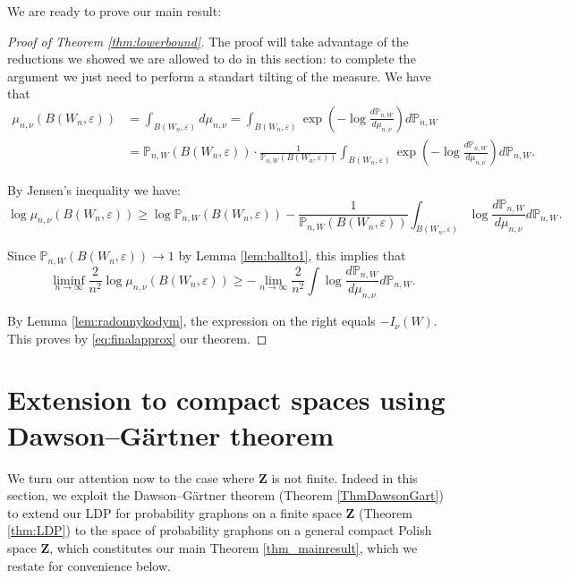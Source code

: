\documentclass[12pt,twoside,a4paper]{article}
\newcommand{\Space}{\mathbf{Z}}
\begin{document}
We are ready to prove our main result:

\begin{proof}[Proof of Theorem \ref{thm:lowerbound}]
The proof will take advantage of the reductions we showed we are allowed to do in this section: to complete the argument we just need to perform a standart tilting of the measure. We have that 
\[
\begin{split}
    \mu_{n,\nu}(B(W_n,\varepsilon)) &= \int_{B(W_n,\varepsilon)} d\mu_{n,\nu} 
= \int_{B(W_n,\varepsilon)} \exp\left( -\log \frac{d\mathbb{P}_{n,W}}{d\mu_{n,\nu}} \right) d\mathbb{P}_{n,W}\\
&= \mathbb{P}_{n,W}(B(W_n,\varepsilon)) \cdot \frac{1}{\mathbb{P}_{n,W}(B(W_n,\varepsilon))} \int_{B(W_n,\varepsilon)} \exp\left( -\log \frac{d\mathbb{P}_{n,W}}{d\mu_{n,\nu}} \right) d\mathbb{P}_{n,W}.
\end{split}
\]

By Jensen’s inequality we have:
\[
\log \mu_{n,\nu}(B(W_n,\varepsilon)) \geq \log \mathbb{P}_{n,W}(B(W_n,\varepsilon))
- \frac{1}{\mathbb{P}_{n,W}(B(W_n,\varepsilon))} \int_{B(W_n,\varepsilon)} \log \frac{d\mathbb{P}_{n,W}}{d\mu_{n,\nu}} d\mathbb{P}_{n,W}.
\]

Since $\mathbb{P}_{n,W}(B(W_n,\varepsilon)) \to 1$ by Lemma \ref{lem:ballto1}, this implies that
\[
\liminf_{n \to \infty} \frac{2}{n^2} \log \mu_{n,\nu}(B(W_n,\varepsilon)) 
\geq - \lim_{n \to \infty} \frac{2}{n^2} \int \log \frac{d\mathbb{P}_{n,W}}{d\mu_{n,\nu}} d\mathbb{P}_{n,W}.
\]

By Lemma \ref{lem:radonnykodym}, the expression on the right equals $-I_\nu(W)$. This proves by \eqref{eq:finalapprox} our theorem. 
\end{proof}

\section{Extension to compact spaces using Dawson--G\"artner theorem}\label{sec:dawsongartner}

We turn our attention now to the case where $\Space$ is not finite. Indeed in this section, we exploit the Dawson--G\"artner theorem (Theorem \ref{ThmDawsonGart}) to extend our LDP for probability graphons on a finite space $\Space$ (Theorem \ref{thm:LDP}) to the space of probability graphons on a general compact Polish space $\Space$, which constitutes our main Theorem \ref{thm_mainresult}, which we restate for convenience below.  

\MainTheorem*
\end{document}
